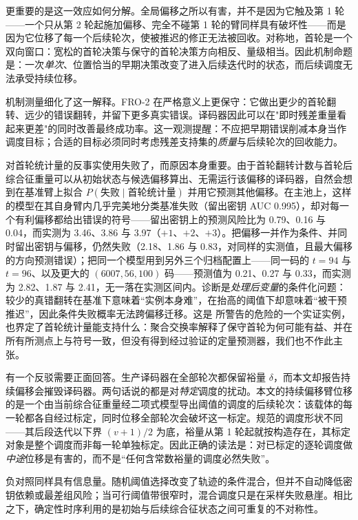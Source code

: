 \documentclass[UTF8,a4paper,10pt,twocolumn]{ctexart}
\begin{document}
更重要的是这一效应如何分解。全局偏移之所以有害，并不是因为它触及第 1 轮——一个只从第 2 轮起施加偏移、完全不碰第 1 轮的臂同样具有破坏性——而是因为它位移了每一个后续轮次，使被推迟的修正无法被回收。对称地，首轮是一个双向窗口：宽松的首轮决策与保守的首轮决策方向相反、量级相当。因此机制命题是：一次\emph{单次}、位置恰当的早期决策改变了进入后续迭代时的状态，而后续调度无法承受持续位移。

机制测量细化了这一解释。FRO-2 在严格意义上更保守：它做出更少的首轮翻转、远少的错误翻转，并留下更多真实错误。译码器因此可以在"即时残差重量看起来更差"的同时改善最终成功率。这一观测提醒：不应把早期错误削减本身当作调度目标；合适的目标必须同时考虑残差支持集的\emph{质量}与后续轮次的回收能力。

对首轮统计量的反事实使用失败了，而原因本身重要。由于首轮翻转计数与首轮后综合征重量可以从初始状态与候选偏移算出、无需运行该偏移的译码器，自然会想到在基准臂上拟合 $P(\text{失败}\mid\text{首轮统计量})$ 并用它预测其他偏移。在主池上，这样的模型在其自身臂内几乎完美地分类基准失败（留出密钥 AUC 0.995），却对每一个有利偏移都给出错误的符号——留出密钥上的预测风险比为 0.79、0.16 与 0.04，而实测为 3.46、3.86 与 3.97（$+1$、$+2$、$+3$）。把偏移一并作为条件、并同时留出密钥与偏移，仍然失败（2.18、1.86 与 0.83，对同样的实测值，且最大偏移的方向预测错误）；把同一个模型用到另外三个归档配置上——同一码的 $t=94$ 与 $t=96$、以及更大的 $(6007,56,100)$ 码——预测值为 0.21、0.27 与 0.33，而实测为 2.82、1.87 与 2.41，无一落在实测区间内。诊断是\emph{处理后变量}的条件化问题：较少的真错翻转在基准下意味着“实例本身难”，在抬高的阈值下却意味着“被干预推迟”，因此条件失败概率无法跨偏移迁移。这是 \cite{annechini2025closedform} 所警告的危险的一个实证实例，也界定了首轮统计量能支持什么：聚合交换率解释了保守首轮为何可能有益、并在所有所测点上与符号一致，但没有得到经过验证的定量预测器，我们也不作此主张。

有一个反驳需要正面回答。生产译码器在全部轮次都保留裕量 $\delta$，而本文却报告持续偏移会摧毁译码器。两句话说的都是对\emph{特定}调度的扰动。本文的持续偏移臂位移的是一个由当前综合征重量经二项式模型导出阈值的调度的后续轮次：该载体的每一轮都各自经过标定，同时位移全部轮次会破坏这一标定。规范的调度形状不同——其后段迭代以下界 $(v{+}1)/2$ 为底，裕量从第 1 轮起就按构造存在，其标定对象是整个调度而非每一轮单独标定。因此正确的读法是：对已标定的逐轮调度做\emph{中途}位移是有害的，而不是“任何含常数裕量的调度必然失败”。

负对照同样具有信息量。随机阈值选择改变了轨迹的条件混合，但并不自动降低密钥依赖或最差组风险；当可行阈值带很窄时，混合调度只是在采样失败悬崖。相比之下，确定性时序利用的是初始与后续综合征状态之间可重复的不对称性。
\end{document}
